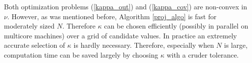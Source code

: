 \documentclass[11pt]{article}
\theoremstyle{definition}
\theoremstyle{definition}
\def\bSigma{{\bf \Sigma}}
\begin{document}

Both optimization problems (\ref{kappa_out}) and (\ref{kappa_cov}) are non-convex in $\nu$.  However, as was mentioned before, Algorithm \ref{proj_algo} is fast for moderately sized $N$. Therefore $\kappa$ can be chosen efficiently (possibly in parallel on multicore machines) over a  grid of candidate values.  In practice an extremely accurate selection of $\kappa$ is hardly necessary. Therefore, especially when $N$ is large, computation time can be saved largely by choosing $\kappa$ with a cruder tolerance. 



%
 











\end{document}
